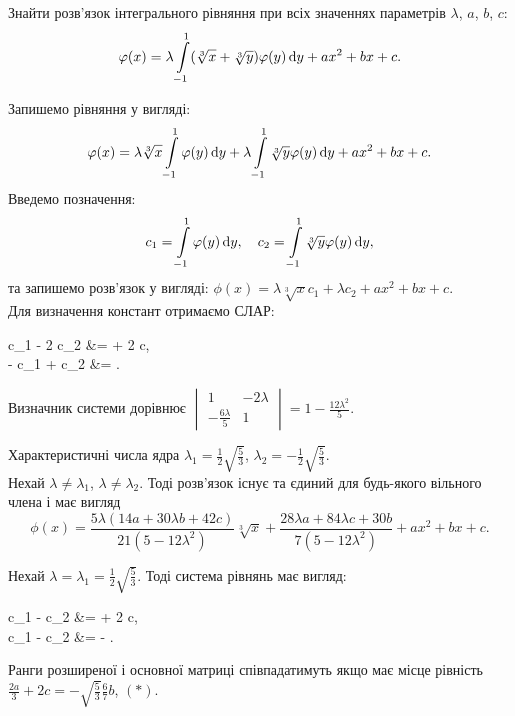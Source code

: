 \begin{example}
	Знайти розв’язок інтегрального рівняння при всіх значеннях параметрів $\lambda$, $a$, $b$, $c$: \[\varphi(x) = \lambda \displaystyle\int\limits_{-1}^1 (\sqrt[3]{x} + \sqrt[3]{y}) \varphi(y) \mathop{}\!\mathrm{d} y + ax^2 + bx + c. \]
\end{example}
\begin{solution*}
	Запишемо рівняння у вигляді: \[\varphi(x) = \lambda \sqrt[3]{x} \displaystyle\int\limits_{-1}^1 \varphi(y) \mathop{}\!\mathrm{d} y + \lambda \displaystyle\int\limits_{-1}^1 \sqrt[3]{y} \varphi(y) \mathop{}\!\mathrm{d} y + ax^2 + bx + c. \]
	Введемо позначення: \[ c_1 = \displaystyle\int\limits_{-1}^1 \varphi(y) \mathop{}\!\mathrm{d} y, \quad c_2 = \displaystyle\int\limits_{-1}^1 \sqrt[3]{y} \varphi(y) \mathop{}\!\mathrm{d} y, \] та запишемо розв’язок у вигляді: $\phi(x) = \lambda \sqrt[3]{x} c_1 + \lambda c_2 + ax^2 + bx + c$. \\

	Для визначення констант отримаємо СЛАР:
	\begin{system*}
		c_1 - 2 \lambda c_2 &=  + 2 c, \\
		-  c_1 + c_2 &= .
	\end{system*}

	Визначник системи дорівнює $\begin{vmatrix} 1 & - 2 \lambda \\ - \frac{6\lambda}{5} & 1 \end{vmatrix} = 1 - \frac{12\lambda^2}{5}$.

	Характеристичні числа ядра $\lambda_1 = \frac{1}{2} \sqrt{\frac{5}{3}}$, $\lambda_2 = - \frac{1}{2} \sqrt{\frac{5}{3}}$. \\

	Нехай $\lambda \ne \lambda_1$, $\lambda \ne \lambda_2$. Тоді розв'язок існує та єдиний для будь-якого вільного члена і має вигляд \[ \phi(x) = \dfrac{5 \lambda (14 a + 30 \lambda b + 42 c)}{21 (5 - 12 \lambda^2)} \sqrt[3]{x} + \dfrac{28 \lambda a + 84 \lambda c + 30 b}{7(5 - 12 \lambda^2)} + ax^2 + bx + c. \]

	Нехай $\lambda = \lambda_1 = \frac{1}{2} \sqrt{\frac{5}{3}}$. Тоді система рівнянь має вигляд:
	\begin{system*}
		c_1 -  c_2 &=  + 2 c, \\
		c_1 -  c_2 &= -  \dfrac{6b}{7}.
	\end{system*}

	Ранги розширеної і основної матриці співпадатимуть якщо має місце рівність $\frac{2a}{3} + 2c = - \sqrt{\frac{5}{3}} \frac{6}{7} b$, $(*)$. \\


\end{solution*}
